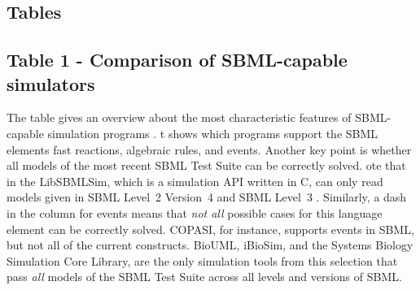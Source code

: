 \documentclass[10pt]{bmc_article}
\newenvironment{bmcformat}{\begin{raggedright}\baselineskip20pt\sloppy\setboolean{publ}{false}}{\end{raggedright}\baselineskip20pt\sloppy}
\begin{document}
\begin{bmcformat}

\section*{Tables}

\subsection*{Table 1 - Comparison of SBML-capable simulators}
The table gives an overview about the most characteristic features of
\acs{SBML}-capable simulation programs .
t shows which programs support the \acs{SBML} elements fast reactions, algebraic rules, and events.
Another key point is whether all models of the most recent SBML Test Suite  can be correctly solved.
ote that in the  
LibSBMLSim, which is a simulation \acs{API} written in C, can only read models given
in \acs{SBML} Level~2 Version~4 and \acs{SBML} Level~3
.
Similarly, a dash in the column for events means that \emph{not all} possible
cases for this language element can be correctly solved.
COPASI, for instance, supports events in \acs{SBML}, but not all of the current 
constructs.
 
BioUML, iBioSim, and the Systems Biology Simulation Core Library, are the 
only simulation tools from this selection that pass \emph{all} models of the
SBML Test Suite across all levels and versions of \acs{SBML}.


\end{bmcformat}
\end{document}
